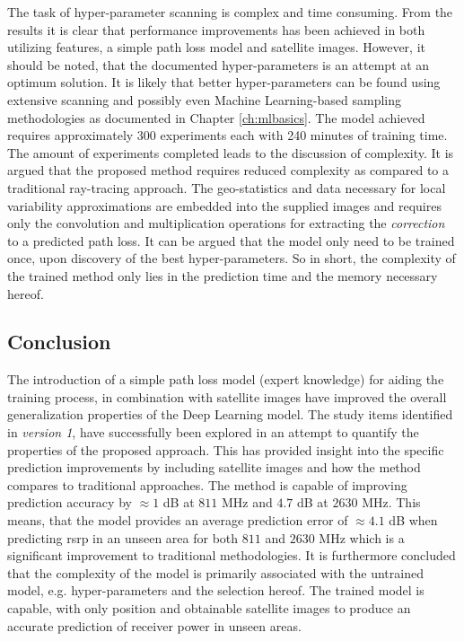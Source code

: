 The task of hyper-parameter scanning is complex and time consuming. From the results it is clear that performance improvements has been achieved in both utilizing features, a simple path loss model and satellite images. However, it should be noted, that the documented hyper-parameters is an attempt at an optimum solution. It is likely that better hyper-parameters can be found using extensive scanning and possibly even Machine Learning-based sampling methodologies as documented in Chapter \ref{ch:mlbasics}. The model achieved requires approximately 300 experiments each with 240 minutes of training time. The amount of experiments completed leads to the discussion of complexity. It is argued that the proposed method requires reduced complexity as compared to a traditional ray-tracing approach. The geo-statistics and data necessary for local variability approximations are embedded into the supplied images and requires only the convolution and multiplication operations for extracting the \emph{correction} to a predicted path loss. It can be argued that the model only need to be trained once, upon discovery of the best hyper-parameters. So in short, the complexity of the trained method only lies in the prediction time and the memory necessary hereof. 

\subsection{Conclusion}\label{subsec:conclusion_v2}
The introduction of a simple path loss model (expert knowledge) for aiding the training process, in combination with satellite images have improved the overall generalization properties of the Deep Learning model. The study items identified in \emph{version 1}, have successfully been explored in an attempt to quantify the properties of the proposed approach. This has provided insight into the specific prediction improvements by including satellite images and how the method compares to traditional approaches. The method is capable of improving prediction accuracy by $\approx 1$ dB at $811$ MHz and $4.7$ dB at $2630$ MHz. This means, that the model provides an average prediction error of $\approx 4.1$ dB when predicting \gls{rsrp} in an unseen area for both $811$ and $2630$ MHz which is a significant improvement to traditional methodologies. It is furthermore concluded that the complexity of the model is primarily associated with the untrained model, e.g. hyper-parameters and the selection hereof. The trained model is capable, with only position and obtainable satellite images to produce an accurate prediction of receiver power in unseen areas.
